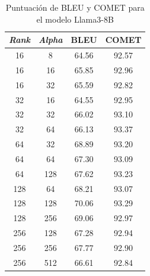 \documentclass[11pt,spanish,listoffigures,listoftables]{tfgetsinf}
\begin{document}
\begin{table}[!h]
\caption{Puntuación de BLEU y COMET para el modelo Llama3-8B}
\begin{center}
\begin{tabular}{ c c | c c }
	\hline
	\textit{Rank} & \textit{Alpha} & BLEU & COMET \\
	\hline
	\hline
	16 & 8 & 64.56 & 92.57 \\
	16 & 16 & 65.85 & 92.96 \\
	16 & 32 & 65.59 & 92.82 \\
	\hline
	32 & 16 & 64.55 & 92.95 \\
	32 & 32 & 66.02 & 93.10 \\
	32 & 64 &  66.13 & 93.37 \\
	\hline
	64 & 32 & 68.89 & 93.20\\
	64 & 64 & 67.30 & 93.09\\
	64 & 128 & 67.62 & 93.23\\
	\hline
	128 & 64 & 68.21 & 93.07\\
	128 & 128 & 70.06 & 93.29\\
	128 & 256 & 69.06 & 92.97\\
	\hline
	256 & 128 & 67.28 & 92.94\\
	256 & 256 & 67.77 & 92.90\\
	256 & 512 & 66.61 & 92.84\\	
	

\end{tabular}
\end{center}
\label{tab: Llama exploración de alpha}
\end{table}
\end{document}

